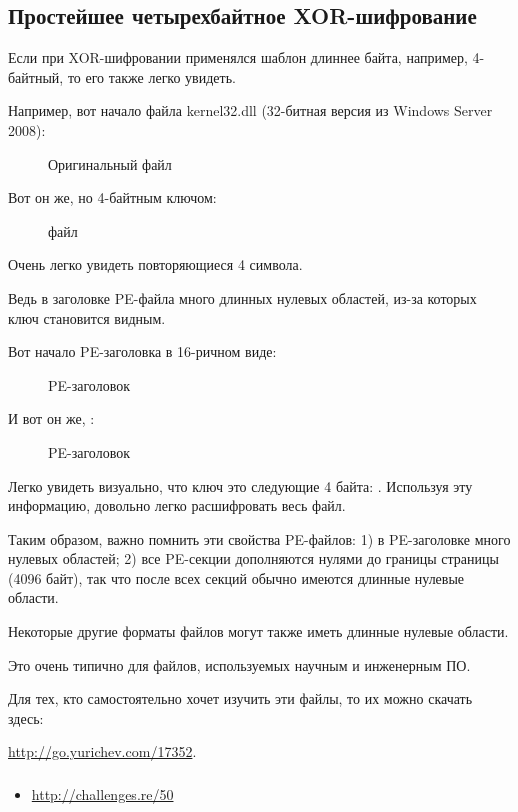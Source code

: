 \clearpage
\subsection{Простейшее четырехбайтное XOR-шифрование}

Если при XOR-шифровании применялся шаблон длиннее байта, например, 4-байтный, то его также легко увидеть.

Например, вот начало файла kernel32.dll (32-битная версия из Windows Server 2008):

\begin{figure}[H]
\centering
{}
\caption{Оригинальный файл}
\end{figure}

\clearpage
Вот он же, но  4-байтным ключом:

\begin{figure}[H]
\centering
{}
\caption{ файл}
\end{figure}

Очень легко увидеть повторяющиеся 4 символа.

Ведь в заголовке PE-файла много длинных нулевых областей, из-за которых ключ становится видным.

\clearpage
Вот начало PE-заголовка в 16-ричном виде:

\begin{figure}[H]
\centering
{}
\caption{PE-заголовок}
\end{figure}

\clearpage
И вот он же, :

\begin{figure}[H]
\centering
{}
\caption{ PE-заголовок}
\end{figure}

Легко увидеть визуально, что ключ это следующие 4 байта: .
Используя эту информацию, довольно легко расшифровать весь файл.

Таким образом, важно помнить эти свойства PE-файлов:
1) в PE-заголовке много нулевых областей;
2) все PE-секции дополняются нулями до границы страницы (4096 байт), 
так что после всех секций обычно имеются длинные нулевые области.

Некоторые другие форматы файлов могут также иметь длинные нулевые области.

Это очень типично для файлов, используемых научным и инженерным ПО.

Для тех, кто самостоятельно хочет изучить эти файлы, то их можно скачать здесь:

\url{http://go.yurichev.com/17352}.

\subsubsection{\Exercise}

\begin{itemize}
	\item \url{http://challenges.re/50}
\end{itemize}


